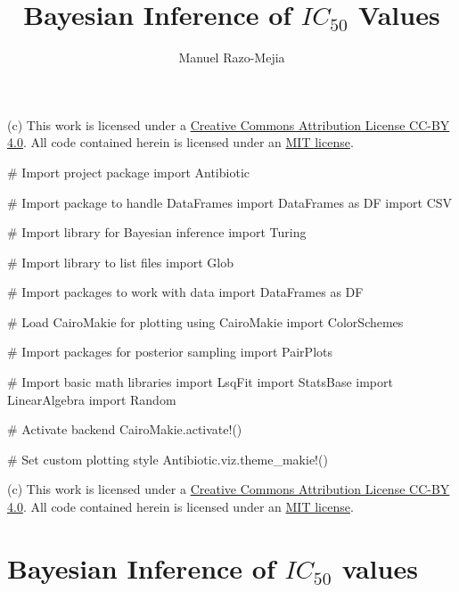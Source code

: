 \documentclass[
]{scrartcl}
\title{Bayesian Inference of \(IC_{50}\) Values}
\author[1]{Manuel Razo-Mejia}
\affil[1]{Department of Biology, Stanford University}
\date{}
\newenvironment{Shaded}{\begin{snugshade}}{\end{snugshade}}
\newcommand{\BuiltInTok}[1]{\textcolor[rgb]{0.00,0.23,0.31}{#1}}
\newcommand{\CommentTok}[1]{\textcolor[rgb]{0.37,0.37,0.37}{#1}}
\newcommand{\FunctionTok}[1]{\textcolor[rgb]{0.28,0.35,0.67}{#1}}
\newcommand{\ImportTok}[1]{\textcolor[rgb]{0.00,0.46,0.62}{#1}}
\newcommand{\NormalTok}[1]{\textcolor[rgb]{0.00,0.23,0.31}{#1}}
\begin{document}
\linenumbers
\maketitle
(c) This work is licensed under a
\href{https://creativecommons.org/licenses/by/4.0/}{Creative Commons
Attribution License CC-BY 4.0}. All code contained herein is licensed
under an \href{https://opensource.org/licenses/MIT}{MIT license}.

\begin{Shaded}
\begin{Highlighting}[]
\CommentTok{\# Import project package}
\ImportTok{import} \BuiltInTok{Antibiotic}

\CommentTok{\# Import package to handle DataFrames}
\ImportTok{import} \BuiltInTok{DataFrames}\NormalTok{ as DF}
\ImportTok{import} \BuiltInTok{CSV}

\CommentTok{\# Import library for Bayesian inference}
\ImportTok{import} \BuiltInTok{Turing}

\CommentTok{\# Import library to list files}
\ImportTok{import} \BuiltInTok{Glob}

\CommentTok{\# Import packages to work with data}
\ImportTok{import} \BuiltInTok{DataFrames}\NormalTok{ as DF}

\CommentTok{\# Load CairoMakie for plotting}
\ImportTok{using} \BuiltInTok{CairoMakie}
\ImportTok{import} \BuiltInTok{ColorSchemes}

\CommentTok{\# Import packages for posterior sampling}
\ImportTok{import} \BuiltInTok{PairPlots}

\CommentTok{\# Import basic math libraries}
\ImportTok{import} \BuiltInTok{LsqFit}
\ImportTok{import} \BuiltInTok{StatsBase}
\ImportTok{import} \BuiltInTok{LinearAlgebra}
\ImportTok{import} \BuiltInTok{Random}

\CommentTok{\# Activate backend}
\NormalTok{CairoMakie.}\FunctionTok{activate!}\NormalTok{()}

\CommentTok{\# Set custom plotting style}
\NormalTok{Antibiotic.viz.}\FunctionTok{theme\_makie!}\NormalTok{()}
\end{Highlighting}
\end{Shaded}

(c) This work is licensed under a
\href{https://creativecommons.org/licenses/by/4.0/}{Creative Commons
Attribution License CC-BY 4.0}. All code contained herein is licensed
under an \href{https://opensource.org/licenses/MIT}{MIT license}.

\section{\texorpdfstring{Bayesian Inference of \(IC_{50}\)
values}{Bayesian Inference of IC\_\{50\} values}}\label{bayesian-inference-of-ic_50-values}
\end{document}
